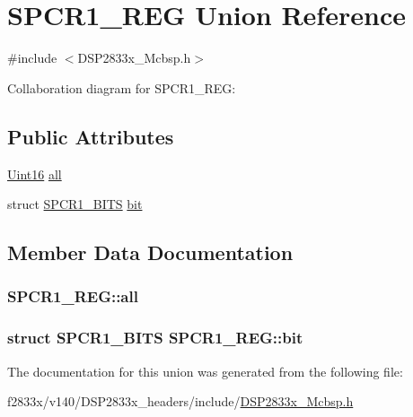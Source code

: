 \hypertarget{union_s_p_c_r1___r_e_g}{}\section{S\+P\+C\+R1\+\_\+\+R\+E\+G Union Reference}
\label{union_s_p_c_r1___r_e_g}


{\ttfamily \#include $<$D\+S\+P2833x\+\_\+\+Mcbsp.\+h$>$}



Collaboration diagram for S\+P\+C\+R1\+\_\+\+R\+E\+G\+:
\subsection*{Public Attributes}
\begin{DoxyCompactItemize}
\item 
\hyperlink{_d_s_p2833x___device_8h_a59a9f6be4562c327cbfb4f7e8e18f08b}{Uint16} \hyperlink{union_s_p_c_r1___r_e_g_a1421308d49073f8852389772b0b9d62c}{all}
\item 
struct \hyperlink{struct_s_p_c_r1___b_i_t_s}{S\+P\+C\+R1\+\_\+\+B\+I\+T\+S} \hyperlink{union_s_p_c_r1___r_e_g_aadde059032983311f9f01409f3416cb8}{bit}
\end{DoxyCompactItemize}


\subsection{Member Data Documentation}
\hypertarget{union_s_p_c_r1___r_e_g_a1421308d49073f8852389772b0b9d62c}{}
\subsubsection[{all}]{ S\+P\+C\+R1\+\_\+\+R\+E\+G\+::all}\label{union_s_p_c_r1___r_e_g_a1421308d49073f8852389772b0b9d62c}
\hypertarget{union_s_p_c_r1___r_e_g_aadde059032983311f9f01409f3416cb8}{}
\subsubsection[{bit}]{\setlength{\rightskip}{0pt plus 5cm}struct {\bf S\+P\+C\+R1\+\_\+\+B\+I\+T\+S} S\+P\+C\+R1\+\_\+\+R\+E\+G\+::bit}\label{union_s_p_c_r1___r_e_g_aadde059032983311f9f01409f3416cb8}


The documentation for this union was generated from the following file\+:\begin{DoxyCompactItemize}
\item 
f2833x/v140/\+D\+S\+P2833x\+\_\+headers/include/\hyperlink{_d_s_p2833x___mcbsp_8h}{D\+S\+P2833x\+\_\+\+Mcbsp.\+h}\end{DoxyCompactItemize}
